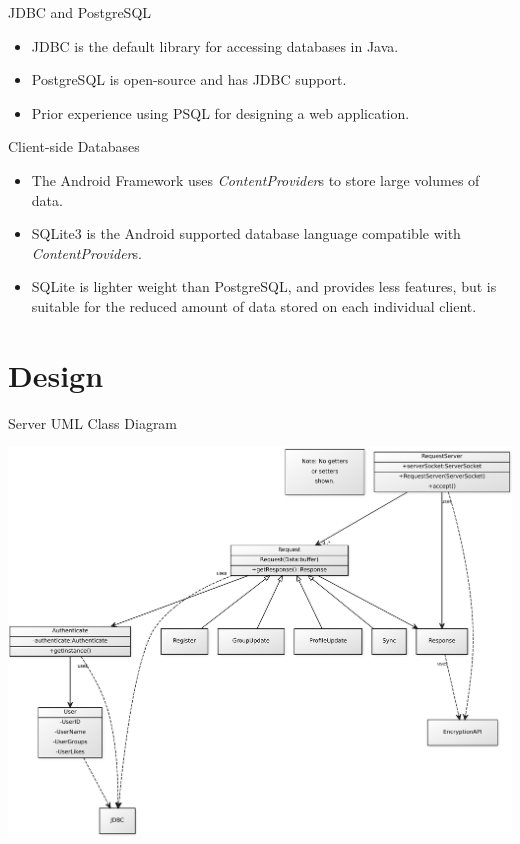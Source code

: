 \documentclass{beamer}
\begin{document}
\begin{frame}{JDBC and PostgreSQL}
\begin{itemize}
\item JDBC is the default library for accessing databases in Java.
\item PostgreSQL is open-source and has JDBC support.
\item Prior experience using PSQL for designing a web application.
\end{itemize}
\end{frame}

\begin{frame}{Client-side Databases}
\begin{itemize}
\item The Android Framework uses \emph{ContentProvider}s to store large volumes of data.
\item SQLite3 is the Android supported database language compatible with \emph{ContentProvider}s.
\item SQLite is lighter weight than PostgreSQL, and provides less features, but is suitable for the
reduced amount of data stored on each individual client.
\end{itemize}
\end{frame}

\section{Design}

\begin{frame}{Server UML Class Diagram}
\begin{center}
\includegraphics[scale=.2]{server.pdf}
\end{center}
\end{frame}
\end{document}

